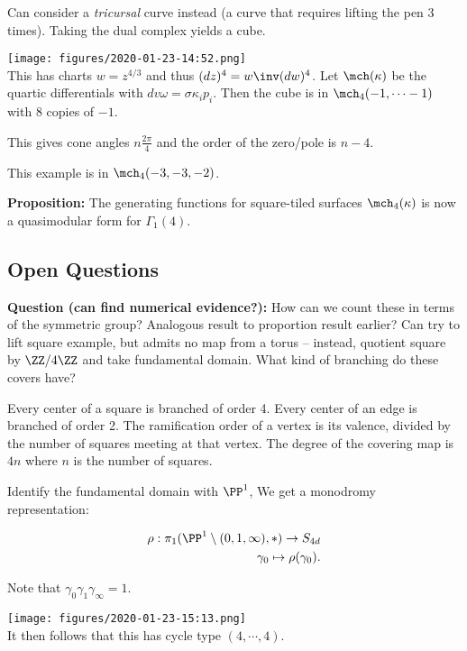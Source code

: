 Can consider a \emph{tricursal} curve instead (a curve that requires
lifting the pen 3 times). Taking the dual complex yields a cube.

\texttt{[image: figures/2020-01-23-14:52.png]}\\

This has charts \(w = z^{4/3}\) and thus \((dz)^4 = w\inv (dw)^4\). Let
\(\mch(\kappa)\) be the quartic differentials with
\(dv \omega = \sigma \kappa_i p_i\). Then the cube is in
\(\mch_4(-1, \cdots -1)\) with \(8\) copies of \(-1\).

This gives cone angles \(n \frac{2\pi}{4}\) and the order of the
zero/pole is \(n-4\).

This example is in \(\mch_4(-3, -3, -2)\).

\textbf{Proposition:} The generating functions for square-tiled surfaces
\(\mch_4(\kappa)\) is now a quasimodular form for \(\Gamma_1(4)\).

\hypertarget{open-questions}{%
\subsection{Open Questions}\label{open-questions}}

\textbf{Question (can find numerical evidence?):} How can we count these
in terms of the symmetric group? Analogous result to proportion result
earlier? Can try to lift square example, but admits no map from a torus
-- instead, quotient square by \(\ZZ/4\ZZ\) and take fundamental domain.
What kind of branching do these covers have?

Every center of a square is branched of order 4. Every center of an edge
is branched of order 2. The ramification order of a vertex is its
valence, divided by the number of squares meeting at that vertex. The
degree of the covering map is \(4n\) where \(n\) is the number of
squares.

Identify the fundamental domain with \(\PP^1\), We get a monodromy
representation:

\begin{align*}
\rho: \pi_1(\PP^1 \setminus(0, 1,\infty), \ast) \to S_{4d} \\
\gamma_0 \mapsto \rho(\gamma_0)
.\end{align*}

Note that \(\gamma_0 \gamma_1 \gamma_\infty = 1\).

\texttt{[image: figures/2020-01-23-15:13.png]}\\

It then follows that this has cycle type \((4, \cdots ,4)\).

